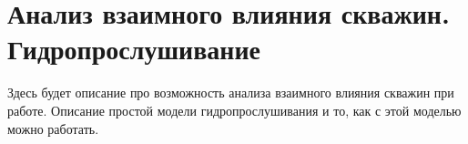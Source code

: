 \section{Анализ взаимного влияния скважин. Гидропрослушивание}

Здесь будет описание про возможность анализа взаимного влияния скважин при работе. 
Описание простой модели гидропрослушивания и то, как с этой моделью можно работать.